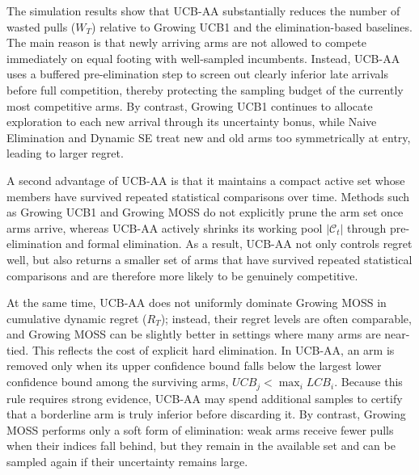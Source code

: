 \documentclass[11pt]{article}
\begin{document}
The simulation results show that UCB-AA substantially reduces the number of wasted pulls
($W_T$) relative to Growing UCB1 and the elimination-based baselines. The main reason is that
newly arriving arms are not allowed to compete immediately on equal footing with well-sampled
incumbents. Instead, UCB-AA uses a buffered pre-elimination step to screen out clearly inferior
late arrivals before full competition, thereby protecting the sampling budget of the currently
most competitive arms. By contrast, Growing UCB1 continues to allocate exploration to each new
arrival through its uncertainty bonus, while Naive Elimination and Dynamic SE treat new and old
arms too symmetrically at entry, leading to larger regret.

A second advantage of UCB-AA is that it maintains a compact active set whose members have
survived repeated statistical comparisons over time. Methods such as Growing UCB1 and Growing MOSS do not explicitly prune the arm
set once arms arrive, whereas UCB-AA actively shrinks its working pool $|\mathcal{C}_t|$ through
pre-elimination and formal elimination. As a result, UCB-AA not only controls regret well, but
also returns a smaller set of arms that have survived repeated statistical comparisons and are
therefore more likely to be genuinely competitive.


At the same time, UCB-AA does not uniformly dominate Growing MOSS in cumulative dynamic regret
($R_T$); instead, their regret levels are often comparable, and Growing MOSS can be slightly
better in settings where many arms are near-tied. This reflects the cost of explicit hard
elimination. In UCB-AA, an arm is removed only when its upper confidence bound falls below
the largest lower confidence bound among the surviving arms,
\(
UCB_j < \max_i LCB_i.
\)
Because this rule requires strong evidence, UCB-AA may spend additional samples to certify that
a borderline arm is truly inferior before discarding it. By contrast, Growing MOSS performs only
a soft form of elimination: weak arms receive fewer pulls when their indices fall behind, but
they remain in the available set and can be sampled again if their uncertainty remains large.
\end{document}
